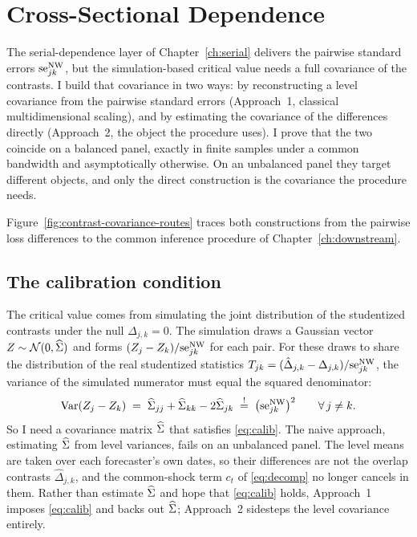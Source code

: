 \chapter{Cross-Sectional Dependence}
\label{ch:cross}

The serial-dependence layer of Chapter~\ref{ch:serial} delivers the pairwise standard
errors $\mathrm{se}^{\mathrm{NW}}_{jk}$, but the simulation-based critical value needs a full covariance of
the contrasts. I build that covariance in two ways: by reconstructing a level covariance
from the pairwise standard errors (Approach~1, classical multidimensional scaling), and
by estimating the covariance of the differences directly (Approach~2, the object the
procedure uses). I prove that the two coincide on a balanced panel, exactly in finite
samples under a common bandwidth and asymptotically otherwise. On an unbalanced panel
they target different objects, and only the direct construction is the covariance the
procedure needs.

Figure~\ref{fig:contrast-covariance-routes} traces both constructions from the pairwise
loss differences to the common inference procedure of Chapter~\ref{ch:downstream}.

\figContrastCovarianceRoutes

\section{The calibration condition}
\label{sec:calibration}

The critical value comes from simulating the joint distribution of the studentized
contrasts under the null $\Delta_{j,k}=0$. The simulation draws a Gaussian vector
$Z\sim\mathcal{N}(0,\widehat{\Sigma})$ and forms $(Z_j - Z_k)/\mathrm{se}^{\mathrm{NW}}_{jk}$ for each pair. For these draws
to share the distribution of the real studentized statistics
$T_{jk} = (\hat{\Delta}_{j,k}-\Delta_{j,k})/\mathrm{se}^{\mathrm{NW}}_{jk}$, the variance of the simulated
numerator must equal the squared denominator:
\begin{equation}
  \operatorname{Var}(Z_j - Z_k)
  \;=\; \widehat{\Sigma}_{jj} + \widehat{\Sigma}_{kk} - 2\widehat{\Sigma}_{jk}
  \;\stackrel{!}{=}\; \big(\mathrm{se}^{\mathrm{NW}}_{jk}\big)^2
  \qquad \forall\, j\neq k.
  \label{eq:calib}
\end{equation}
So I need a covariance matrix $\widehat{\Sigma}$ that satisfies \eqref{eq:calib}. The naive approach,
estimating $\widehat{\Sigma}$ from level variances, fails on an unbalanced panel. The level means are
taken over each forecaster's own dates, so their differences are not the overlap
contrasts $\hat\Delta_{j,k}$, and the common-shock term $c_t$ of \eqref{eq:decomp} no
longer cancels in them. Rather than estimate $\widehat{\Sigma}$ and hope that \eqref{eq:calib} holds,
Approach~1 imposes \eqref{eq:calib} and backs out $\widehat{\Sigma}$; Approach~2 sidesteps the level
covariance entirely.

